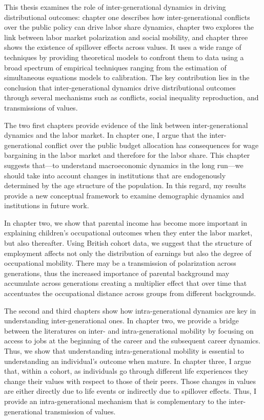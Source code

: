 This thesis examines the role of inter-generational dynamics in driving distributional outcomes: chapter one describes how inter-generational conflicts over the public policy can drive labor share dynamics, chapter two explores the link between labor market polarization and social mobility, and chapter three shows the existence of spillover effects across values.
It uses a wide range of techniques by providing theoretical models to confront them to data using a broad spectrum of empirical techniques ranging from the estimation of simultaneous equations models to calibration. The key contribution lies in the conclusion that inter-generational dynamics drive distributional outcomes through several mechanisms such as conflicts, social inequality reproduction, and transmissions of values.

The two first chapters provide evidence of the link between inter-generational dynamics and the labor market. In chapter one, I argue that the inter-generational conflict over the public budget allocation has consequences for wage bargaining in the labor market and therefore for the labor share. This chapter suggests that---to understand macroeconomic dynamics in the long run---we should take into account changes in institutions that are endogenously determined by the age structure of the population. In this regard, my results provide a new conceptual framework to examine demographic dynamics and institutions in future work.

In chapter two, we show that parental income has become more important in explaining children's occupational outcomes when they enter the labor market, but also thereafter. Using British cohort data, we suggest that the structure of employment affects not only the distribution of earnings but also the degree of occupational mobility. There may be a transmission of polarization across generations, thus the increased importance of parental background may accumulate across generations creating a multiplier effect that over time that accentuates the occupational distance across groups from different backgrounds.

The second and third chapters show how intra-generational dynamics are key in understanding inter-generational ones. In chapter two, we provide a bridge between the literatures on inter- and intra-generational mobility by focusing on access to jobs at the beginning of the career and the subsequent career dynamics. Thus, we show that understanding intra-generational mobility is essential to understanding an individual’s outcome when mature. In chapter three, I argue that, within a cohort, as individuals go through different life experiences they change their values with respect to those of their peers. Those changes in values are either directly due to life events or indirectly due to spillover effects. Thus, I provide an intra-generational mechanism that is complementary to the inter-generational transmission of values.



